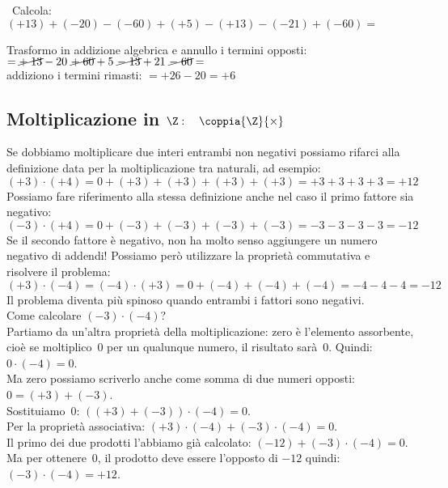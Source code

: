 \begin{esempio}{}{}
~Calcola: \((+13)+(-20)-(-60)+(+5)-(+13)-(-21)+(-60)=\) 

Trasformo in addizione algebrica e annullo i termini opposti:\\
\(=\cancel{+\;13}-20~\cancel{+\;60}+5~\cancel{-\;13}+21~\cancel{-\;60}=\)\\
addiziono i termini rimasti:\hspace{15.3mm}
\(= +26 - 20 = +6\)
\end{esempio}


\subsection{Moltiplicazione in $\Z: \quad \coppia{\Z}{\times}$}

Se dobbiamo moltiplicare due interi entrambi non negativi possiamo rifarci 
alla definizione data per la moltiplicazione tra naturali, ad esempio:
\[(+3) \cdot (+4) = 0 + (+3) + (+3) + (+3) + (+3) = +3+3+3+3 = +12\]
Possiamo fare riferimento alla stessa definizione anche nel caso il primo 
fattore sia negativo:
\[(-3) \cdot (+4) = 0 + (-3) + (-3) + (-3) + (-3) = -3-3-3-3 = -12\]
Se il secondo fattore è negativo, non ha molto senso aggiungere un numero 
negativo di addendi!
Possiamo però utilizzare la proprietà commutativa e risolvere il problema:
\[(+3) \cdot (-4) = (-4) \cdot (+3) = 
  0 + (-4) + (-4) + (-4) = -4-4-4 = -12\]
Il problema diventa più spinoso quando entrambi i fattori sono negativi.\\
Come calcolare \((-3) \cdot (-4)\)?\\
Partiamo da un'altra proprietà della moltiplicazione: zero è l'elemento 
assorbente, cioè se moltiplico~0 per un qualunque numero, il risultato 
sarà~0.
Quindi: \quad \(0 \cdot (-4) = 0\).\\
Ma zero possiamo scriverlo anche come somma di due numeri opposti: \quad 
\(0 = (+3) + (-3)\).\\
Sostituiamo~0: \quad \(((+3) + (-3)) \cdot (-4) = 0\).\\
Per la proprietà associativa: \quad 
\((+3) \cdot (-4) + (-3) \cdot (-4) = 0\).\\
Il primo dei due prodotti l'abbiamo già calcolato: \quad 
\((-12) + (-3) \cdot (-4) = 0\).\\
Ma per ottenere~0, il prodotto deve essere l'opposto di \(-12\) quindi: 
\quad \((-3) \cdot (-4) = +12\).


